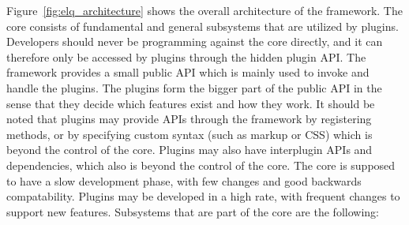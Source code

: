 \documentclass[a4paper,11pt]{kth-mag}
\begin{document}
        Figure~\ref{fig:elq_architecture} shows the overall architecture of the framework.
        The core consists of fundamental and general subsystems that are utilized by plugins.
        Developers should never be programming against the core directly, and it can therefore only be accessed by plugins through the hidden plugin \gls{API}.
        The framework provides a small public \gls{API} which is mainly used to invoke and handle the plugins.
        The plugins form the bigger part of the public \gls{API} in the sense that they decide which features exist and how they work.
        It should be noted that plugins may provide \glspl{API} through the framework by registering methods, or by specifying custom syntax (such as markup or \gls{CSS}) which is beyond the control of the core.
        Plugins may also have interplugin \glspl{API} and dependencies, which also is beyond the control of the core.
        The core is supposed to have a slow development phase, with few changes and good backwards compatability.
        Plugins may be developed in a high rate, with frequent changes to support new features.
        Subsystems that are part of the core are the following:
\end{document}
